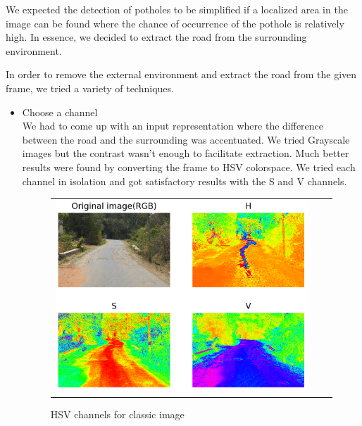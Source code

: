 \documentclass[12pt,a4paper]{article}
\begin{document}
We expected the detection of potholes to be simplified if a localized area in the image can be found where the chance of occurrence of the pothole is relatively high. In essence, we decided to extract the road from the surrounding environment.

In order to remove the external environment and extract the road from the given frame, we tried a variety of techniques. 

\begin{itemize}

\item Choose a channel \\
    We had to come up with an input representation where the difference between the road and the surrounding was accentuated. We tried Grayscale images but the contrast wasn't enough to facilitate extraction. Much better results were found by converting the frame to HSV colorspace. We tried each channel in isolation and got satisfactory results with the S and V channels. 

 \begin{figure}[!ht]
\begin{center}

\begin{tabular}{ccc}
\centering
\includegraphics[width = 5in]{images/rgb_hsv_highdpi.png}
\end{tabular}
\caption{HSV channels for classic image}

\end{center}
\end{figure}


\end{itemize}
\end{document}
